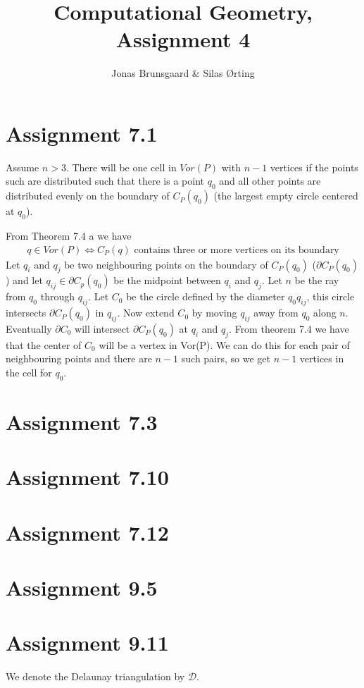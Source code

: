 \documentclass[10pt,a4paper,final,oneside,openany,article,oldfontcommands]{memoir}
\title{Computational Geometry, Assignment 4}
\author{
    Jonas Brunsgaard \& Silas Ørting
}
\newcommand{\D}{\mathcal{D}}
\begin{document}
\maketitle


\chapter*{Assignment 7.1}
Assume $n > 3$. There will be one cell in $Vor(P)$ with $n-1$ vertices if the points such are distributed such that there is a point $q_0$ and all other points are distributed evenly on the boundary of $C_P(q_0)$ (the largest empty circle centered at $q_0$).

From Theorem 7.4 a we have
\begin{align*}
  q \in Vor(P) \iff C_P(q) \text{ contains three or more vertices on its boundary}
\end{align*}
Let $q_i$ and $q_j$ be two neighbouring points on the boundary of $C_P(q_0)$ ($\partial C_P(q_0)$) and let $q_{ij} \in \partial C_p(q_0)$ be the midpoint between $q_i$ and $q_j$. Let $n$ be the ray from $q_0$ through $q_{ij}$. Let $C_0$ be the circle defined by the diameter $q_0q_{ij}$, this circle intersects $\partial C_P(q_0)$ in $q_{ij}$. Now extend $C_0$ by moving $q_{ij}$ away from $q_0$ along $n$. Eventually $\partial C_0$ will intersect $\partial C_P(q_0)$ at $q_i$ and $q_j$. From theorem 7.4 we have that the center of $C_0$ will be a vertex in Vor(P). We can do this for each pair of neighbouring points and there are $n-1$ such pairs, so we get $n-1$ vertices in the cell for $q_0$.

\chapter*{Assignment 7.3}


\chapter*{Assignment 7.10}


\chapter*{Assignment 7.12}


\chapter*{Assignment 9.5}


\chapter*{Assignment 9.11}
We denote the Delaunay triangulation by $\D$.
\end{document}
